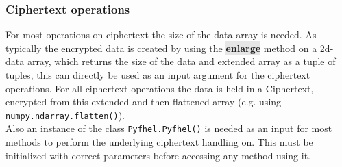 \documentclass[a4paper]{article}
\newcommand{\python}[1]{\texttt{#1}}
\newcommand{\pymethod}[1]{{\ttfamily\colorbox[HTML]{e6e6e6}{\color[HTML]{0066ba}\textbf{\small #1}}}}
\begin{document}
\subsubsection*{Ciphertext operations}
For most operations on ciphertext the size of the data array is needed. As typically the encrypted data is created by using the \pymethod{enlarge} method on a 2d-data array, which returns the size of the data and extended array as a tuple of tuples, this can directly be used as an input argument for the ciphertext operations.
For all ciphertext operations the data is held in a Ciphertext, encrypted from this extended and then flattened array (e.g. using \python{numpy.ndarray.flatten()}).\\
Also an instance of the class \python{Pyfhel.Pyfhel()} is needed as an input for most methods to perform the underlying ciphertext handling on. This must be initialized with correct parameters before accessing any method using it.\vspace{0.5cm}\\
\sffamily
\end{document}
